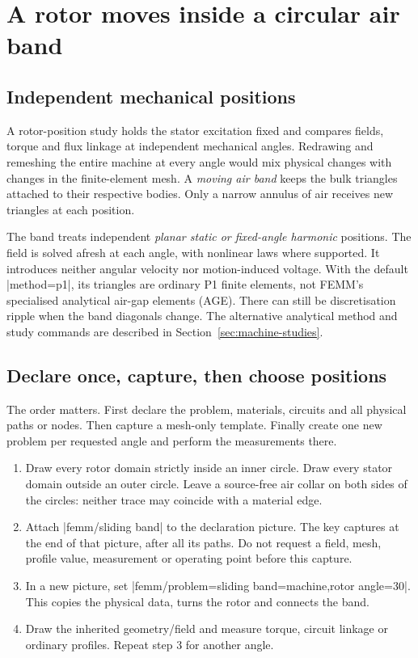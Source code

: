 \section{A rotor moves inside a circular air band}
\label{sec:sliding}

\subsection{Independent mechanical positions}
A rotor-position study holds the stator excitation fixed and compares
fields, torque and flux linkage at independent mechanical angles. Redrawing and remeshing the entire machine at every
angle would mix physical changes with changes in the finite-element mesh.
A \emph{moving air band} keeps the bulk triangles attached to their respective
bodies. Only a narrow annulus of air receives new triangles at each position.

The band treats independent \emph{planar static or fixed-angle harmonic} positions.
The field is solved afresh at each angle, with nonlinear laws where supported. It introduces
neither angular velocity nor motion-induced voltage. With the default |method=p1|, its triangles are ordinary
P1 finite elements, not FEMM's specialised analytical air-gap elements (AGE).
There can still be discretisation ripple when the band diagonals change.
The alternative analytical method and study commands are described in
Section~\ref{sec:machine-studies}.

\subsection{Declare once, capture, then choose positions}
The order matters. First declare the problem, materials, circuits and all
physical paths or nodes. Then capture a mesh-only template. Finally create
one new problem per requested angle and perform the measurements there.
\begin{enumerate}
\item Draw every rotor domain strictly inside an inner circle. Draw every
  stator domain outside an outer circle. Leave a source-free air collar on
  both sides of the circles: neither trace may coincide with a material edge.
\item Attach |femm/sliding band| to the declaration picture. The key captures
  at the end of that picture, after all its paths. Do not request a field,
  mesh, profile value, measurement or operating point before this capture.
\item In a new picture, set |femm/problem={sliding band=machine,rotor angle=30}|.
  This copies the physical data, turns the rotor and connects the band.
\item Draw the inherited geometry/field and measure torque, circuit linkage
  or ordinary profiles. Repeat step 3 for another angle.
\end{enumerate}

